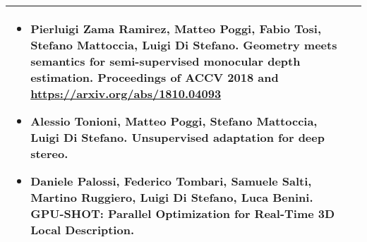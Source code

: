\begin{center}
{\begin{tabular}{@{}p{25mm}|p{190mm}@{}}
{\begin{itemize}
\item Pierluigi Zama Ramirez, Matteo Poggi, Fabio Tosi, Stefano Mattoccia, Luigi Di Stefano. Geometry meets semantics for semi-supervised monocular depth estimation. Proceedings of ACCV 2018 and \href{arXiv:1810.0493}{https://arxiv.org/abs/1810.04093}
\item Alessio Tonioni, Matteo Poggi, Stefano Mattoccia, Luigi Di Stefano. Unsupervised adaptation for deep stereo. 
\item Daniele Palossi, Federico Tombari, Samuele Salti, Martino Ruggiero, Luigi Di Stefano, Luca Benini. GPU-SHOT: Parallel Optimization for Real-Time 3D Local Description. 
\end{itemize}}\tabularnewline\bottomrule

\end{tabular}
}%
\end{center}
